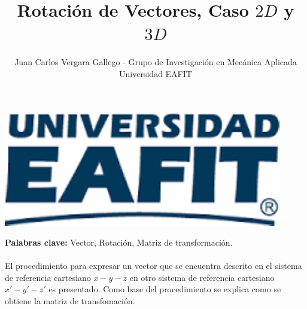 \documentclass[12pt,letterpaper, twoside, openany]{article}
\author{Juan Carlos Vergara Gallego - Grupo de Investigación en Mecánica Aplicada \\ Universidad EAFIT}
\title{\textbf{Rotación de Vectores, Caso $2D$ y $3D$}}
\begin{document}
\pagestyle{fancyplain}
\fancyhf{}
\headheight=20pt %
\renewcommand{\headrulewidth}{0pt} %

\lhead %
{
\begin{minipage}{3cm}
\includegraphics[width=1.5 in]{img/logo.pdf}
\end{minipage}
}

\fancyfoot[c]{\thepage}

\maketitle


{\bf Palabras clave:} Vector, Rotación, Matriz de transformación.\\\\

\abstract
%
El procedimiento para expresar un vector que se encuentra descrito en el sistema de referencia cartesiano $x-y-z$ en otro sistema de referencia cartesiano $x'-y'-z'$ es presentado. Como base del procedimiento se explica como se obtiene la matriz de transfomación. 
%
%
\end{document}
